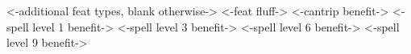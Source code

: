 { <-additional feat types, blank otherwise-> }
{ <-feat fluff-> }
{ <-cantrip benefit-> }
{ <-spell level 1 benefit-> }
{ <-spell level 3 benefit-> }
{ <-spell level 6 benefit-> }
{ <-spell level 9 benefit-> }